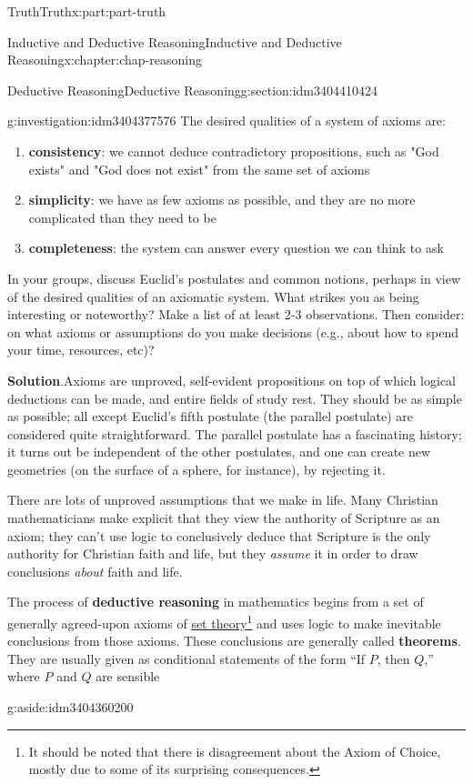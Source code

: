 \documentclass[oneside,10pt,]{book}
\newcommand{\blocktitlefont}{\relax}
\newcommand{\terminology}[1]{\textbf{#1}}
\numberwithin{equation}{section}
\begin{document}
\begin{partptx}{Truth}{}{Truth}{}{}{x:part:part-truth}
\begin{chapterptx}{Inductive and Deductive Reasoning}{}{Inductive and Deductive Reasoning}{}{}{x:chapter:chap-reasoning}
\begin{sectionptx}{Deductive Reasoning}{}{Deductive Reasoning}{}{}{g:section:idm3404410424}
\begin{investigation}{}{g:investigation:idm3404377576}
The desired qualities of a system of axioms are:%
%
\begin{enumerate}
\item{}\terminology{consistency}: we cannot deduce contradictory propositions, such as "God exists" and "God does not exist" from the same set of axioms%
\item{}\terminology{simplicity}: we have as few axioms as possible, and they are no more complicated than they need to be%
\item{}\terminology{completeness}: the system can answer every question we can think to ask%
\end{enumerate}
In your groups, discuss Euclid's postulates and common notions, perhaps in view of the desired qualities of an axiomatic system. What strikes you as being interesting or noteworthy? Make a list of at least 2-3 observations. Then consider: on what axioms or assumptions do you make decisions (e.g., about how to spend your time, resources, etc)?%
\par\smallskip%
\noindent\textbf{\blocktitlefont Solution}.\hypertarget{g:solution:idm3404366856}{}\quad{}Axioms are unproved, self-evident propositions on top of which logical deductions can be made, and entire fields of study rest. They should be as simple as possible; all except Euclid's fifth postulate (the parallel postulate) are considered quite straightforward. The parallel postulate has a fascinating history; it turns out be independent of the other postulates, and one can create new geometries (on the surface of a sphere, for instance), by rejecting it.%
\par
There are lots of unproved assumptions that we make in life. Many Christian mathematicians make explicit that they view the authority of Scripture as an axiom; they can't use logic to conclusively deduce that Scripture is the only authority for Christian faith and life, but they \emph{assume} it in order to draw conclusions \emph{about} faith and life.%
\end{investigation}%
The process of \terminology{deductive reasoning} in mathematics begins from a set of generally agreed-upon axioms of \href{https://en.wikipedia.org/wiki/Zermelo–Fraenkel_set_theory}{set theory}\footnote{It should be noted that there is disagreement about the Axiom of Choice, mostly due to some of its surprising consequences.\label{g:fn:idm3404363384}} and uses logic to make inevitable conclusions from those axioms. These conclusions are generally called \terminology{theorems}. They are usually given as conditional statements of the form ``If \(P\), then \(Q\),'' where \(P\) and \(Q\) are sensible\begin{aside}{}{g:aside:idm3404360200}%

\end{aside}
\end{sectionptx}
\end{chapterptx}
\end{partptx}
\end{document}
